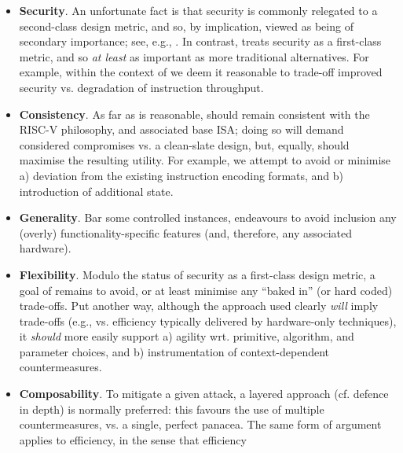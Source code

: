 \begin{itemize}
      \begin{itemize}
      \item {\bf         Security}.
            An unfortunate fact is that security is commonly relegated to a 
            second-class design metric, and so, by implication, viewed as 
            being of secondary importance;
            see, e.g., \cite{SCARV:Lee:03,SCARV:RKLMR:03,SCARV:RRKH:04,SCARV:BurMutTiw:16}.
            In contrast, \XCID treats security as a first-class metric, and
            so {\em at least} as important as more traditional alternatives.
            For example,
            within the context of \XCID we deem it reasonable to trade-off 
            improved security vs. degradation of instruction throughput.
      \item {\bf      Consistency}.
            As far as is reasonable, \XCID should remain consistent with the
            RISC-V philosophy, and associated base ISA; doing so will demand 
            considered compromises vs. a clean-slate design, but, equally,
            should maximise the resulting utility.
            For example,
            we attempt to avoid or minimise 
            a) deviation from the existing instruction encoding formats,
               and 
            b) introduction of additional state.
      \item {\bf       Generality}.
            Bar some controlled instances, \XCID endeavours to avoid inclusion
            any (overly) functionality-specific features (and, therefore, any
            associated hardware).  
      \item {\bf      Flexibility}. 
            Modulo the status of security as a first-class design metric, a
            goal of \XCID remains to avoid, or at least minimise any ``baked 
            in'' (or hard coded) trade-offs.  Put another way, although the 
            approach used clearly {\em will} imply trade-offs 
            (e.g., vs. efficiency typically delivered by hardware-only techniques), 
            it {\em should} more easily support
            a) agility wrt. primitive, algorithm, and parameter choices,
               and
            b) instrumentation of context-dependent countermeasures.
      \item {\bf    Composability}.
            To mitigate a given attack, a layered approach (cf. defence in 
            depth) is normally preferred: this favours the use of multiple
            countermeasures, vs. a single, perfect panacea.  The same form
            of argument applies to efficiency, in the sense that efficiency 

\end{itemize}
\end{itemize}
